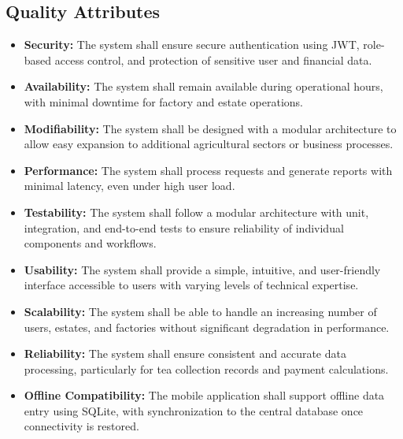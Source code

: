 \subsection{Quality Attributes}
\begin{itemize}
    \item \textbf{Security:} The system shall ensure secure authentication using JWT, role-based access control, and protection of sensitive user and financial data.
    \item \textbf{Availability:} The system shall remain available during operational hours, with minimal downtime for factory and estate operations.
    \item \textbf{Modifiability:} The system shall be designed with a modular architecture to allow easy expansion to additional agricultural sectors or business processes.
    \item \textbf{Performance:} The system shall process requests and generate reports with minimal latency, even under high user load.
    \item \textbf{Testability:} The system shall follow a modular architecture with unit, integration, and end-to-end tests to ensure reliability of individual components and workflows.
    \item \textbf{Usability:} The system shall provide a simple, intuitive, and user-friendly interface accessible to users with varying levels of technical expertise.
    \item \textbf{Scalability:} The system shall be able to handle an increasing number of users, estates, and factories without significant degradation in performance.
    \item \textbf{Reliability:} The system shall ensure consistent and accurate data processing, particularly for tea collection records and payment calculations.
    \item \textbf{Offline Compatibility:} The mobile application shall support offline data entry using SQLite, with synchronization to the central database once connectivity is restored.
\end{itemize}